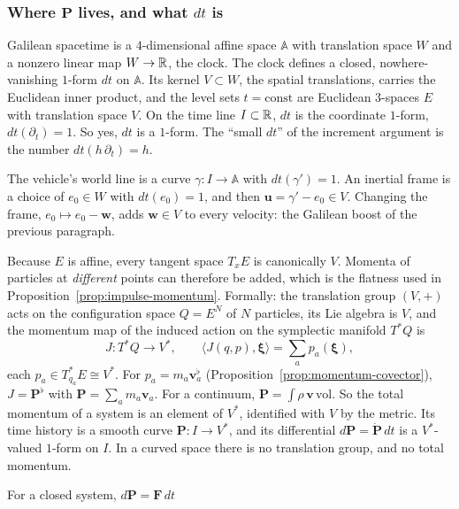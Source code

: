 \subsubsection*{Where $\mathbf P$ lives, and what $dt$ is}
\begin{description}\itemsep2pt
\item[Spacetime and time.] Galilean spacetime is a $4$-dimensional affine
  space $\mathbb A$ with translation space $W$ and a nonzero linear map
  $W\to\mathbb{R}$, the clock. The clock defines a closed, nowhere-vanishing
  $1$-form $dt$ on $\mathbb A$. Its kernel $V\subset W$, the spatial
  translations, carries the Euclidean inner product, and the level sets
  $t=\text{const}$ are Euclidean $3$-spaces $E$ with translation space $V$.
  On the time line $I\subset\mathbb{R}$, $dt$ is the coordinate $1$-form,
  $dt(\partial_t)=1$. So yes, $dt$ is a $1$-form. The ``small $dt$'' of the
  increment argument is the number $dt(h\,\partial_t)=h$.
\item[Velocity and frames.] The vehicle's world line is a curve
  $\gamma:I\to\mathbb A$ with $dt(\gamma')=1$. An inertial frame is a choice
  of $e_0\in W$ with $dt(e_0)=1$, and then $\mathbf u=\gamma'-e_0\in V$.
  Changing the frame, $e_0\mapsto e_0-\mathbf w$, adds $\mathbf w\in V$ to
  every velocity: the Galilean boost of the previous paragraph.
\item[Momentum.] Because $E$ is affine, every tangent space $T_xE$ is
  canonically $V$. Momenta of particles at \emph{different} points can
  therefore be added, which is the flatness used in
  Proposition~\ref{prop:impulse-momentum}. Formally: the translation group
  $(V,+)$ acts on the configuration space $Q=E^N$ of $N$ particles, its Lie
  algebra is $V$, and the momentum map of the induced action on the
  symplectic manifold $T^*Q$ is
  \[
   J:T^*Q\to V^*,\qquad
   \langle J(q,p),\boldsymbol\xi\rangle=\sum_a p_a(\boldsymbol\xi),
  \]
  each $p_a\in T^*_{q_a}E\cong V^*$. For $p_a=m_a\mathbf v_a^\flat$
  (Proposition~\ref{prop:momentum-covector}), $J=\mathbf P^\flat$ with
  $\mathbf P=\sum_am_a\mathbf v_a$. For a continuum,
  $\mathbf P=\int\rho\,\mathbf v\,\mathrm{vol}$. So the total momentum of a
  system is an element of $V^*$, identified with $V$ by the metric. Its time
  history is a smooth curve $\mathbf P:I\to V^*$, and its differential
  $d\mathbf P=\dot{\mathbf P}\,dt$ is a $V^*$-valued $1$-form on $I$. In a
  curved space there is no translation group, and no total momentum.
\item[Newton's law as forms.] For a closed system, $d\mathbf P=\mathbf F\,dt$

\end{description}
